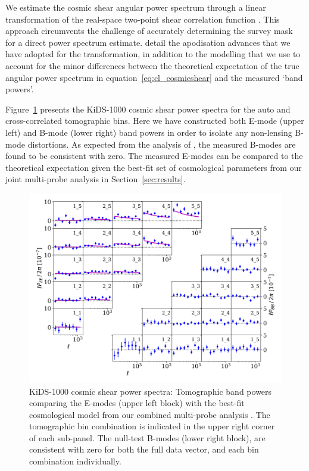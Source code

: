 We estimate the cosmic shear angular power spectrum through a linear transformation of the real-space two-point shear correlation function \citep{schneider/etal:2002}.  This approach circumvents the challenge of accurately determining the survey mask for a direct power spectrum estimate.  \citet{joachimi/etal:inprep} detail the apodisation advances that we have adopted for the transformation, in addition to the modelling that we use to account for the minor differences between the theoretical expectation of the true angular power spectrum in equation~\ref{eq:cl_cosmicshear} and the measured `band powers'.    
 
Figure~\ref{fig:Pkk} presents the \citet{asgari/etal:inprep} KiDS-1000 cosmic shear power spectra for the auto and cross-correlated tomographic bins.   Here we have constructed both E-mode (upper left) and B-mode (lower right) band powers in order to isolate any non-lensing B-mode distortions.     As expected from the analysis of \citet{giblin/etal:inprep}, the measured B-modes are found to be consistent with zero.   The measured E-modes can be compared to the theoretical expectation given the best-fit set of cosmological parameters from our joint multi-probe analysis in Section~\ref{sec:results}.



\begin{figure}
        \includegraphics[width=\textwidth]{Data_Plots/Pkk/Pkk_K1000_2Dbins_v2_goldclasses_Flag_SOM_Fid_A.png}
        \caption{KiDS-1000 cosmic shear power spectra:  Tomographic
          band powers comparing the E-modes (upper left block) with the best-fit
          cosmological model from our combined multi-probe analysis
          .  The tomographic
        bin combination is indicated in the upper right corner of each
      sub-panel.  The null-test B-modes (lower right block), are
      consistent with zero for both the full data vector, and each
     bin combination individually.}
        \label{fig:Pkk}
\end{figure}


